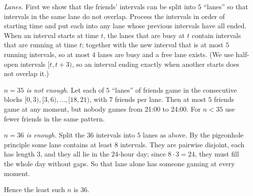 \emph{Lanes.} First we show that the friends' intervals can be split into $5$ ``lanes'' so that intervals in the same lane do not overlap. Process the intervals in order of starting time and put each into any lane whose previous intervals have all ended. When an interval starts at time $t$, the lanes that are busy at $t$ contain intervals that are running at time $t$; together with the new interval that is at most $5$ running intervals, so at most $4$ lanes are busy and a free lane exists. (We use half-open intervals $[t,t+3)$, so an interval ending exactly when another starts does not overlap it.)

\emph{$n=35$ is not enough.} Let each of $5$ ``lanes'' of friends game in the consecutive blocks $[0,3),[3,6),\dots,[18,21)$, with $7$ friends per lane. Then at most $5$ friends game at any moment, but nobody games from 21:00 to 24:00. For $n<35$ use fewer friends in the same pattern.

\emph{$n=36$ is enough.} Split the $36$ intervals into $5$ lanes as above. By the pigeonhole principle some lane contains at least $8$ intervals. They are pairwise disjoint, each has length $3$, and they all lie in the $24$-hour day; since $8\cdot3=24$, they must fill the whole day without gaps. So that lane alone has someone gaming at every moment.

Hence the least such $n$ is $\boxed{36}$.
